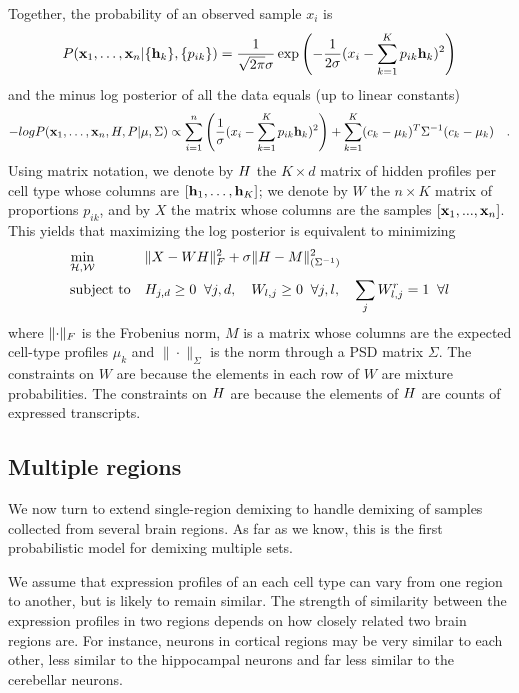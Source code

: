 \documentclass{article} %
\newcommand{\W}{W}
\begin{document}
Together, the probability of an observed sample $x_i$ is
\begin{equation*}
    P(\mathbf{x}_1,\ldots,\mathbf{x}_n | \{\mathbf{h}_k\}, \{p_{ik}\}) =  \frac{1}{\sqrt{2\pi}\sigma} \exp\left(-\frac{1}{2\sigma} (x_i - \sum_{k=1}^K p_{ik} \mathbf{h}_k)^2 \right)
\end{equation*}
and the minus log posterior of all the data equals (up to linear constants)
\begin{equation*}
    - log P(\mathbf{x}_1,\ldots,\mathbf{x}_n, {H}, P| \mu, \Sigma) \propto
    \sum_{i=1}^n \left({ \frac{1}{\sigma} (x_i - \sum_{k=1}^K p_{ik} \mathbf{h}_k)^2 }\right)
     + \sum_{k=1}^K (c_k-\mu_k)^T\Sigma^{-1}(c_k-\mu_k) \quad.
\end{equation*}
Using matrix notation, we denote by ${H}$ the $K \times d$ matrix of hidden profiles per cell type whose columns are $\left[{\mathbf{h}_1, \ldots, \mathbf{h}_K}\right]$; we denote by $W$ the $n \times K$ matrix of proportions $p_{ik}$,
and by $X$ the matrix whose columns are the samples $\left[{\mathbf{x}_1,..., \mathbf{x}_n}\right]$. This yields that maximizing the log posterior is equivalent to minimizing 
\begin{equation}
    \label{eq-single}
    \begin{aligned}
        & \underset{\cal{{H}},\cal{W}}{\text{min}}  
        & & \|{X - W {H}}\|_F^2 + \sigma \|{ {H} - M }\|^2_{(\Sigma^{-1})}\\
            & \text{subject to} &
            &  H_{j,d} \geq 0 \;\;\forall j,d , \quad W_{l,j} \geq 0 \;\; \forall j,l ,\quad \sum_j W^r_{l,j} = 1 \;\; \forall l \\
        \end{aligned}
\end{equation}
where $\|{\cdot}\|_F$ is the Frobenius norm, $M$ is a matrix whose columns are the expected cell-type profiles $\mu_k$ and  $\|\cdot\|_{\Sigma}$ is the norm through a PSD matrix $\Sigma$. The constraints on $\W$ are because the elements in each row of $\W$ are mixture probabilities. The constraints on ${H}$ are because the elements of ${H}$ are counts of expressed transcripts.

\subsection{Multiple regions}
We now turn to extend single-region demixing to handle demixing of samples collected from several brain regions. 
As far as we know, this is the first probabilistic model for demixing multiple sets.

We assume that expression profiles of an each cell type can vary from one region to another, but is likely to remain similar. The strength of similarity between the expression profiles in two regions depends on how closely related two brain regions are. For instance, neurons in cortical regions may be very similar to each other, less similar to the hippocampal neurons and far less similar to the cerebellar neurons. 
\end{document}
